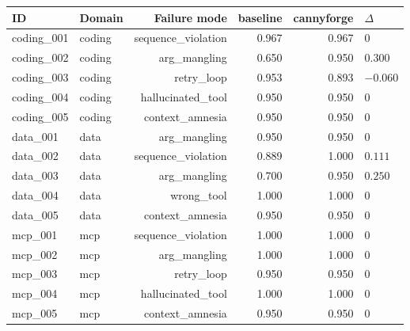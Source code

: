 \begin{tabular}{llrrrl}
\toprule
ID & Domain & Failure mode & baseline & cannyforge & $\Delta$ \\
\midrule
coding\_001 & coding\ & sequence\_violation & 0.967 & 0.967 & 0 \\
coding\_002 & coding\ & arg\_mangling & 0.650 & 0.950 & $0.300$ \\
coding\_003 & coding\ & retry\_loop & 0.953 & 0.893 & $-0.060$ \\
coding\_004 & coding\ & hallucinated\_tool & 0.950 & 0.950 & 0 \\
coding\_005 & coding\ & context\_amnesia & 0.950 & 0.950 & 0 \\
data\_001 & data\ & arg\_mangling & 0.950 & 0.950 & 0 \\
data\_002 & data\ & sequence\_violation & 0.889 & 1.000 & $0.111$ \\
data\_003 & data\ & arg\_mangling & 0.700 & 0.950 & $0.250$ \\
data\_004 & data\ & wrong\_tool & 1.000 & 1.000 & 0 \\
data\_005 & data\ & context\_amnesia & 0.950 & 0.950 & 0 \\
mcp\_001 & mcp\ & sequence\_violation & 1.000 & 1.000 & 0 \\
mcp\_002 & mcp\ & arg\_mangling & 1.000 & 1.000 & 0 \\
mcp\_003 & mcp\ & retry\_loop & 0.950 & 0.950 & 0 \\
mcp\_004 & mcp\ & hallucinated\_tool & 1.000 & 1.000 & 0 \\
mcp\_005 & mcp\ & context\_amnesia & 0.950 & 0.950 & 0 \\
\bottomrule
\end{tabular}
